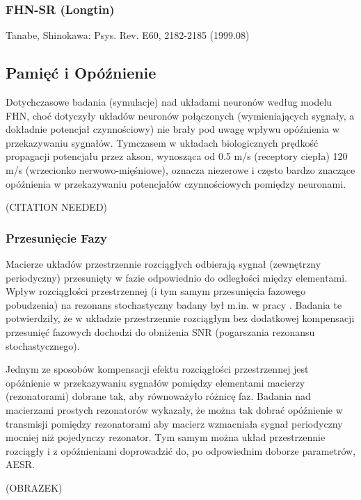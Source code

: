   \subsubsection{FHN-SR (Longtin)}


  Tanabe, Shinokawa: Psys. Rev. E60, 2182-2185 (1999.08)
  
  \subsection{Pamięć i Opóźnienie}
  
  Dotychczasowe badania (symulacje) nad układami neuronów według modelu FHN, choć dotyczyły układów neuronów połączonych (wymieniających sygnały, a dokładnie potencjał czynnościowy) nie brały pod uwagę wpływu opóźnienia w przekazywaniu sygnałów. Tymczasem w układach biologicznych prędkość propagacji potencjału przez akson, wynosząca od 0.5 m/s (receptory ciepła) 120 m/s (wrzecionko nerwowo-mięśniowe), oznacza niezerowe i często bardzo znaczące opóźnienia w przekazywaniu potencjałów czynnościowych pomiędzy neuronami.

  (CITATION NEEDED)

  \subsubsection{Przesunięcie Fazy}
  \label{sec:przesuniecie_fazy}

  Macierze układów przestrzennie rozciągłych odbierają sygnał (zewnętrzny periodyczny) przesunięty w fazie odpowiednio do odległości między elementami. Wpływ rozciągłości przestrzennej (i tym samym przesunięcia fazowego pobudzenia) na rezonans stochastyczny badany był m.in. w pracy \cite{ijmpb_14_8}. Badania te potwierdziły, że w układzie przestrzennie rozciągłym bez dodatkowej kompensacji przesunięć fazowych dochodzi do obniżenia SNR (pogarszania rezonansu stochastycznego).

  Jednym ze sposobów kompensacji efektu rozciągłości przestrzennej jest opóźnienie w przekazywaniu sygnałów pomiędzy elementami macierzy (rezonatorami) dobrane tak, aby równoważyło różnicę faz. Badania nad macierzami prostych rezonatorów \cite{ijmpb_23_2} wykazały, że można tak dobrać opóźnienie w transmisji pomiędzy rezonatorami aby macierz wzmacniała sygnał periodyczny mocniej niż pojedynczy rezonator. Tym samym można układ przestrzennie rozciągły i z opóźnieniami doprowadzić do, po odpowiednim doborze parametrów, AESR.


  (OBRAZEK)

